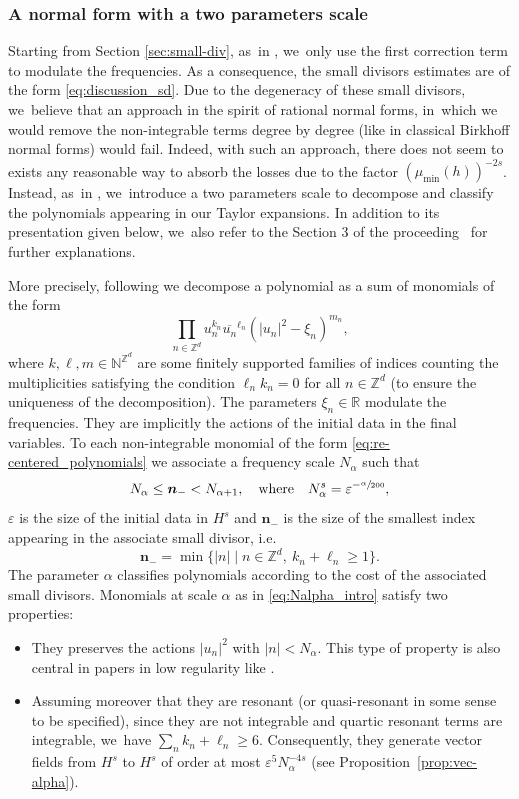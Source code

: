 \documentclass[10pt,a4paper]{amsart}
\providecommand{\ie}{i.e.}
\theoremstyle{plain}
\theoremstyle{definition}
\newcommand{\nb}{{\boldsymbol n}}
\newcommand{\Z}{\mathbb{Z}}
\newcommand{\R}{\mathbb{R}}
\newcommand{\1}{\mathbf{1}}
\begin{document}
\subsubsection{A normal form with a two parameters scale} \label{sub:fin_de_lintro}
Starting from Section \ref{sec:small-div}, as~in \cite{Bou00}, we~only use the first correction term to modulate the frequencies. As a consequence, the small divisors estimates are of the form \eqref{eq:discussion_sd}. Due to the degeneracy of these small divisors, we~believe that an approach in the spirit of rational normal forms, in~which we would remove the non-integrable terms degree by degree (like in classical Birkhoff normal forms) would fail. Indeed, with such an approach, there does not seem to exists any reasonable way to absorb the losses due to the factor $(\mu_{\min}(h))^{-2s} $.
Instead, as~in \cite{Bou00}, we~introduce a two parameters scale to decompose and classify the polynomials appearing in our Taylor expansions. In addition to its presentation given below, we~also refer to the Section 3 of the proceeding~\cite{C25} for further explanations.

More precisely, following \cite{Bou00} we decompose a polynomial as a sum of monomials of the form
\begin{equation}
\label{eq:re-centered_polynomials}
\prod_{n\in \mathbb{Z}^d} u_{n}^{k_{n}}\overline{u_{n}}^{\ell_{n}}(|u_{n}|^{2} - \xi_n)^{m_n},
\end{equation}
where $k,\ell,m\in \mathbb{N}^{\mathbb{Z}^d}$ are some finitely supported families of indices counting the multiplicities satisfying the condition $\ell_n k_n = 0$ for all $n\in \mathbb{Z}^d$ (to ensure the uniqueness of the decomposition). The parameters $\xi_n\in\R$ modulate the frequencies. They are implicitly the actions of the initial data in the final variables. To each non-integrable monomial of the form \eqref{eq:re-centered_polynomials} we associate a frequency scale $N_{\alpha}$ such that
\begin{equation}
\label{eq:Nalpha_intro}
N_{\alpha} \leq \nb_{-} < N_{\alpha+1}, \quad \mathrm{where} \quad N_\alpha^{s} = \varepsilon^{-\sfrac{\alpha}{200}},
\end{equation}
$\varepsilon$ is the size of the initial data in $H^s$ and $\nb_{-}$ is the size of the smallest index appearing in the associate small divisor, \ie
\[
\nb_{-}=\min\{|n|\mid n\in\Z^{d},\ k_{n}+\ell_{n}\geq1\}.
\]
The parameter $\alpha$ classifies polynomials according to the cost of the associated small divisors. Monomials at scale $\alpha$ as in \eqref{eq:Nalpha_intro} satisfy two properties:
\begin{itemize}
\item They preserves the actions $|u_n|^2$ with $|n|<N_{\alpha}$. This type of property is also central in papers in low regularity like \cite{BGR23}.
\item Assuming moreover that they are resonant (or quasi-resonant in some sense to be specified), since they are not integrable and quartic resonant terms are integrable, we~have $\sum_n k_n +\ell_n \geq 6$. Consequently, they generate vector fields from $H^s$ to $H^s$ of order at most $\varepsilon^{5}N_\alpha^{-4s}$ (see Proposition~\ref{prop:vec-alpha}).
\end{itemize}
\end{document}
